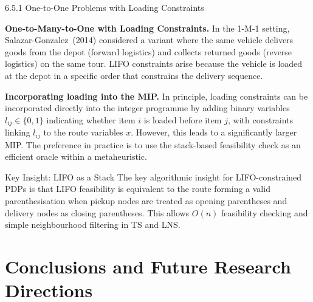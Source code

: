 \documentclass[aspectratio=169,10pt]{beamer}
\begin{document}
\begin{frame}[allowframebreaks]{6.5.1 One-to-One Problems with Loading Constraints}
  \framebreak

  \textbf{One-to-Many-to-One with Loading Constraints.}  In the 1-M-1 setting,
  Salazar-Gonzalez~(2014) considered a variant where the same vehicle delivers goods
  from the depot (forward logistics) and collects returned goods (reverse logistics) on
  the same tour. LIFO constraints arise because the vehicle is loaded at the depot in a
  specific order that constrains the delivery sequence.

  \textbf{Incorporating loading into the MIP.}  In principle, loading constraints can
  be incorporated directly into the integer programme by adding binary variables
  $l_{ij} \in \{0,1\}$ indicating whether item $i$ is loaded before item $j$, with
  constraints linking $l_{ij}$ to the route variables $x$. However, this leads to a
  significantly larger MIP. The preference in practice is to use the stack-based
  feasibility check as an efficient oracle within a metaheuristic.

  \begin{alertblock}{Key Insight: LIFO as a Stack}
    The key algorithmic insight for LIFO-constrained PDPs is that LIFO feasibility
    is equivalent to the route forming a valid parenthesisation when pickup nodes are
    treated as opening parentheses and delivery nodes as closing parentheses. This
    allows $O(n)$ feasibility checking and simple neighbourhood filtering in TS and LNS.
  \end{alertblock}

\end{frame}

\section{Conclusions and Future Research Directions}
\end{document}

